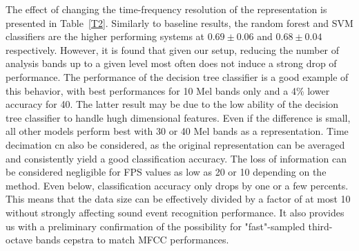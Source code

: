 \documentclass[12pt,times,onecolumn]{article}
\begin{document}
The effect of changing the time-frequency resolution of the representation is presented in Table~\ref{T2}. Similarly to baseline results, the random forest and SVM classifiers are the higher performing systems at $0.69\pm 0.06$ and $0.68\pm 0.04$ respectively. However, it is found that given our setup, reducing the number of analysis bands up to a given level most often does not induce a strong drop of performance. The performance of the decision tree classifier is a good example of this behavior, with best performances for 10 Mel bands only and a 4\% lower accuracy for 40. The latter result may be due to the low ability of the decision tree classifier to handle hugh dimensional features. Even if the difference is small, all other models perform best with 30 or 40 Mel bands as a representation. Time decimation cn also be considered, as the original representation can be averaged and consistently yield a good classification accuracy. The loss of information can be considered negligible for FPS values as low as 20 or 10 depending on the method. Even below, classification accuracy only drops by one or a few percents. This means that the data size can be effectively divided by a factor of at most 10 without strongly affecting sound event recognition performance. It also provides us with a preliminary confirmation of the possibility for "fast"-sampled third-octave bands cepstra to match MFCC performances.\\
\end{document}
